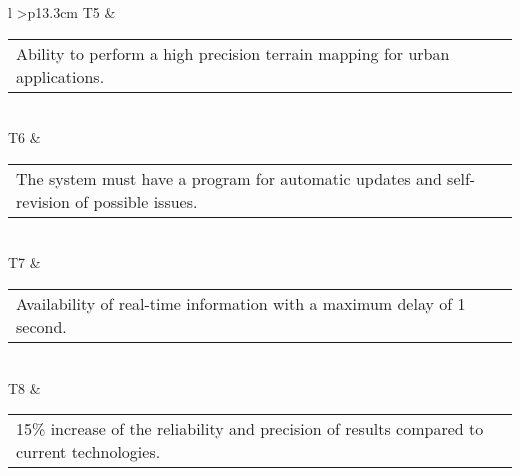 \begin{longtable}[H]{l >{\centering\arraybackslash}p{13.3cm}}
	T5 & \begin{tabular}[c]{@{}l@{}}\begin{minipage}[t]{\linewidth}
			Ability to perform a high precision terrain mapping for urban applications. \vspace{0.3cm}
	\end{minipage} \end{tabular}                                                                                                                                             \\  \midrule
	T6 & \begin{tabular}[c]{@{}l@{}}\begin{minipage}[t]{\linewidth}
			The system must have a program for automatic updates and self-revision of possible issues. \vspace{0.3cm}
	\end{minipage} \end{tabular}                                                                                                                                          \\  \midrule
	T7 & \begin{tabular}[c]{@{}l@{}}\begin{minipage}[t]{\linewidth}
			Availability of real-time information with a maximum delay of 1 second. \vspace{0.3cm}
	\end{minipage} \end{tabular}
	\\ \midrule
	T8 & \begin{tabular}[c]{@{}l@{}}\begin{minipage}[t]{\linewidth}
			15\% increase of the reliability and precision of results compared to current technologies. \vspace{0.3cm}
	\end{minipage} \end{tabular}                                                                                                                                             \\                                                                   	\bottomrule[2pt]
	\caption{Technical requirements}
\end{longtable}